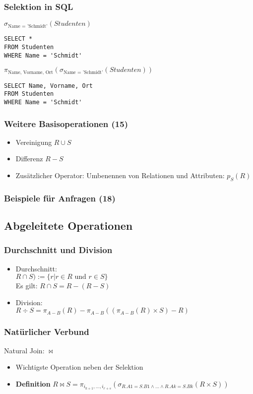 \subsubsection{Selektion in SQL}
\(\sigma_{\text{Name = 'Schmidt'}}(Studenten)\)
\begin{lstlisting}
SELECT *
FROM Studenten
WHERE Name = 'Schmidt'
\end{lstlisting}
\(\pi_{\text{Name, Vorname, Ort}}(\sigma_{\text{Name = 'Schmidt'}}(Studenten))\)
\begin{lstlisting}
SELECT Name, Vorname, Ort
FROM Studenten
WHERE Name = 'Schmidt' 
\end{lstlisting}
\subsubsection{Weitere Basisoperationen (15)}
\begin{itemize}
	\item Vereinigung \(R\cup S\)
	\item Differenz \(R - S\)
	\item Zusätzlicher Operator: Umbenennen von Relationen und Attributen: \(p_S(R)\)
\end{itemize}
\subsubsection{Beispiele für Anfragen (18)}
\subsection{Abgeleitete Operationen}
\subsubsection{Durchschnitt und Division}
\begin{itemize}
	\item Durchschnitt: \\
	\(R\cap S) := \{r|r\in R \text{ und } r \in S\}\) \\
	Es gilt: \(R\cap S = R - (R-S)\)
	\item Division: \\
	\(R \div S = \pi_{A-B}(R) - \pi_{A-B}((\pi_{A-B}(R) \times S)-R)\) 
\end{itemize}
\subsubsection{Natürlicher Verbund}
Natural Join: \(\bowtie\)
\begin{itemize}
	\item Wichtigste Operation neben der Selektion
	\item \textbf{Definition} \(R\bowtie S = \pi_{i_{k+1},\ldots, i_{r+s}}(\sigma_{R.A1 = S.B1 \wedge \ldots \wedge R.Ak = S.Bk}(R\times S))\)
\end{itemize}
